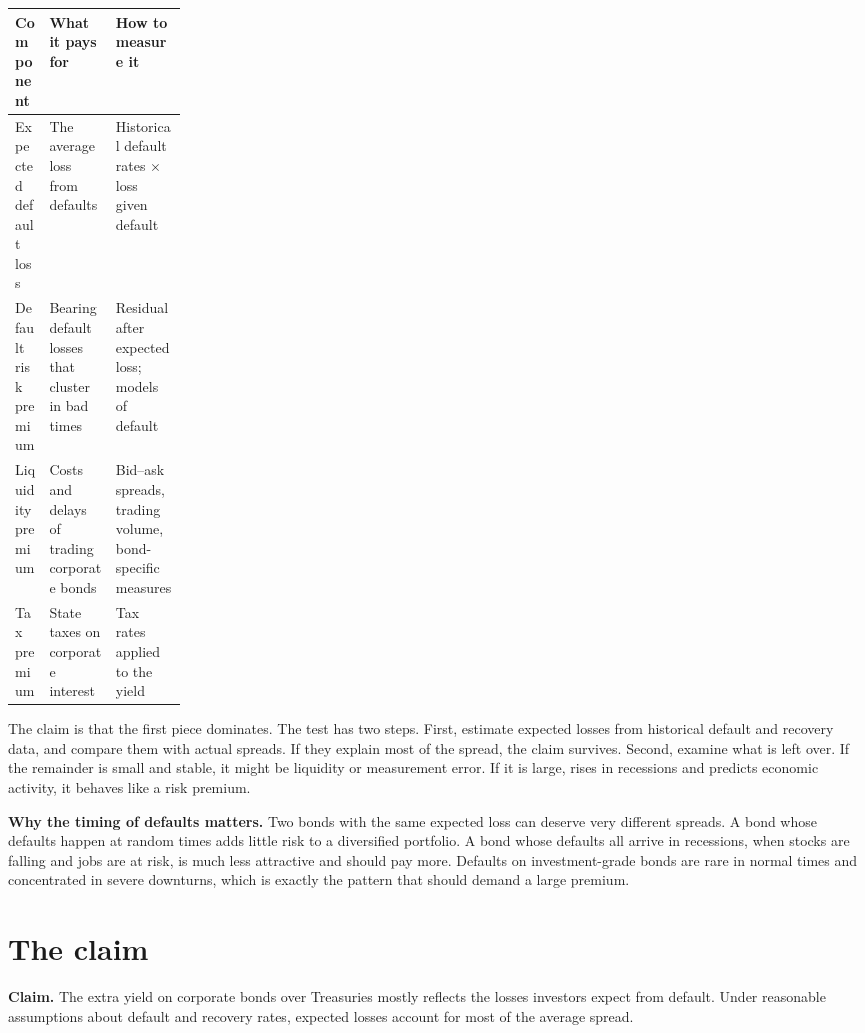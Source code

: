\begin{center}
\small
\begin{tabularx}{0.9\linewidth}{@{}>{\raggedright\arraybackslash}p{0.2\linewidth}>{\raggedright\arraybackslash}X>{\raggedright\arraybackslash}X@{}}
\toprule
Component & What it pays for & How to measure it \\
\midrule
Expected default loss & The average loss from defaults & Historical default rates $\times$ loss given default \\
Default risk premium & Bearing default losses that cluster in bad times & Residual after expected loss; models of default \\
Liquidity premium & Costs and delays of trading corporate bonds & Bid--ask spreads, trading volume, bond-specific measures \\
Tax premium & State taxes on corporate interest & Tax rates applied to the yield \\
\bottomrule
\end{tabularx}
\end{center}

The claim is that the first piece dominates. The test has two steps. First, estimate expected losses from historical default and recovery data, and compare them with actual spreads. If they explain most of the spread, the claim survives. Second, examine what is left over. If the remainder is small and stable, it might be liquidity or measurement error. If it is large, rises in recessions and predicts economic activity, it behaves like a risk premium.

\textbf{Why the timing of defaults matters.} Two bonds with the same expected loss can deserve very different spreads. A bond whose defaults happen at random times adds little risk to a diversified portfolio. A bond whose defaults all arrive in recessions, when stocks are falling and jobs are at risk, is much less attractive and should pay more. Defaults on investment-grade bonds are rare in normal times and concentrated in severe downturns, which is exactly the pattern that should demand a large premium.


\section{The claim}
\label{sec:15-claim}

\begin{callout}
\textbf{Claim.} The extra yield on corporate bonds over Treasuries mostly reflects the losses investors expect from default. Under reasonable assumptions about default and recovery rates, expected losses account for most of the average spread.
\end{callout}

